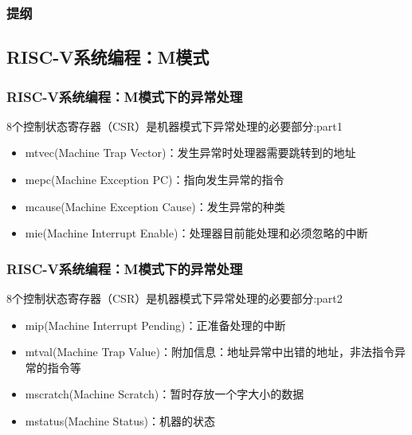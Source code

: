 \begin{frame}
\frametitle{提纲} %
\tableofcontents %
\end{frame}

\subsection{RISC-V系统编程：M模式}
\begin{frame}
    \frametitle{RISC-V系统编程：M模式下的异常处理}
    8个控制状态寄存器（CSR）是机器模式下异常处理的必要部分:part1
    \begin{itemize}
        \item mtvec(Machine Trap Vector)：发生异常时处理器需要跳转到的地址
        \item mepc(Machine Exception PC)：指向发生异常的指令
        \item mcause(Machine Exception Cause)：发生异常的种类
        \item mie(Machine Interrupt Enable)：处理器目前能处理和必须忽略的中断
                
    \end{itemize}
    
    
\end{frame}

\begin{frame}
    \frametitle{RISC-V系统编程：M模式下的异常处理}
    8个控制状态寄存器（CSR）是机器模式下异常处理的必要部分:part2
    \begin{itemize}
        \item mip(Machine Interrupt Pending)：正准备处理的中断
        \item mtval(Machine Trap Value)：附加信息：地址异常中出错的地址，非法指令异常的指令等
        \item mscratch(Machine Scratch)：暂时存放一个字大小的数据
        \item mstatus(Machine Status)：机器的状态
        
    \end{itemize}
    
    
\end{frame}

